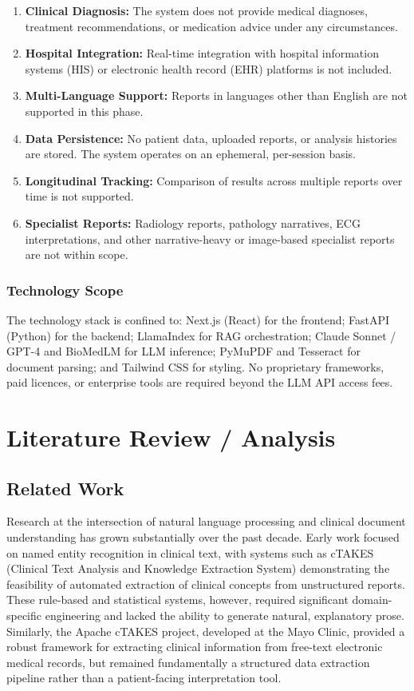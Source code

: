 \documentclass[12pt,a4paper]{report}
\begin{document}
\begin{enumerate}
    \item \textbf{Clinical Diagnosis:} The system does not provide medical diagnoses, treatment recommendations, or medication advice under any circumstances.
    \item \textbf{Hospital Integration:} Real-time integration with hospital information systems (HIS) or electronic health record (EHR) platforms is not included.
    \item \textbf{Multi-Language Support:} Reports in languages other than English are not supported in this phase.
    \item \textbf{Data Persistence:} No patient data, uploaded reports, or analysis histories are stored. The system operates on an ephemeral, per-session basis.
    \item \textbf{Longitudinal Tracking:} Comparison of results across multiple reports over time is not supported.
    \item \textbf{Specialist Reports:} Radiology reports, pathology narratives, ECG interpretations, and other narrative-heavy or image-based specialist reports are not within scope.
\end{enumerate}

\subsection{Technology Scope}
The technology stack is confined to: Next.js (React) for the frontend; FastAPI (Python) for the backend; LlamaIndex for RAG orchestration; Claude Sonnet / GPT-4 and BioMedLM for LLM inference; PyMuPDF and Tesseract for document parsing; and Tailwind CSS for styling. No proprietary frameworks, paid licences, or enterprise tools are required beyond the LLM API access fees.

\chapter{Literature Review / Analysis}

\section{Related Work}
Research at the intersection of natural language processing and clinical document understanding has grown substantially over the past decade. Early work focused on named entity recognition in clinical text, with systems such as cTAKES (Clinical Text Analysis and Knowledge Extraction System) demonstrating the feasibility of automated extraction of clinical concepts from unstructured reports. These rule-based and statistical systems, however, required significant domain-specific engineering and lacked the ability to generate natural, explanatory prose. Similarly, the Apache cTAKES project, developed at the Mayo Clinic, provided a robust framework for extracting clinical information from free-text electronic medical records, but remained fundamentally a structured data extraction pipeline rather than a patient-facing interpretation tool.
\end{document}
